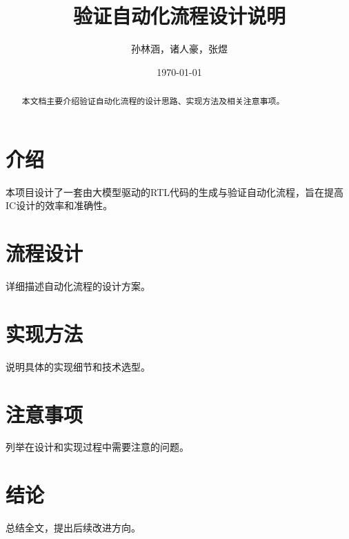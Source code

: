 \documentclass[UTF8]{ctexart}
\title{验证自动化流程设计说明}
\author{孙林涵，诸人豪，张煜}
\date{\today}
\begin{document}
\maketitle

\begin{abstract}
本文档主要介绍验证自动化流程的设计思路、实现方法及相关注意事项。
\end{abstract}

\section{介绍}
本项目设计了一套由大模型驱动的RTL代码的生成与验证自动化流程，旨在提高IC设计的效率和准确性。
\section{流程设计}
详细描述自动化流程的设计方案。

\section{实现方法}
说明具体的实现细节和技术选型。

\section{注意事项}
列举在设计和实现过程中需要注意的问题。

\section{结论}
总结全文，提出后续改进方向。
\end{document}
